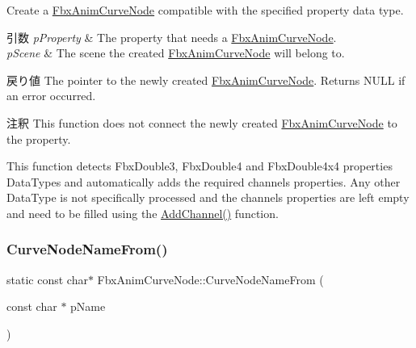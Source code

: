 Create a \hyperlink{class_fbx_anim_curve_node}{Fbx\+Anim\+Curve\+Node} compatible with the specified property data type. 
\begin{DoxyParams}{引数}
{\em p\+Property} & The property that needs a \hyperlink{class_fbx_anim_curve_node}{Fbx\+Anim\+Curve\+Node}. \\
\hline
{\em p\+Scene} & The scene the created \hyperlink{class_fbx_anim_curve_node}{Fbx\+Anim\+Curve\+Node} will belong to. \\
\hline
\end{DoxyParams}
\begin{DoxyReturn}{戻り値}
The pointer to the newly created \hyperlink{class_fbx_anim_curve_node}{Fbx\+Anim\+Curve\+Node}. Returns N\+U\+LL if an error occurred. 
\end{DoxyReturn}
\begin{DoxyRemark}{注釈}
This function does not connect the newly created \hyperlink{class_fbx_anim_curve_node}{Fbx\+Anim\+Curve\+Node} to the property. 

This function detects Fbx\+Double3, Fbx\+Double4 and Fbx\+Double4x4 properties Data\+Types and automatically adds the required channels properties. Any other Data\+Type is not specifically processed and the channels properties are left empty and need to be filled using the \hyperlink{class_fbx_anim_curve_node_a985772edb8c85825adfef69c6bd06627}{Add\+Channel()} function. 
\end{DoxyRemark}
\mbox{\label{class_fbx_anim_curve_node_ae75e53bb5e39cdefcd59e15e23924a13}} 
\subsubsection{\texorpdfstring{Curve\+Node\+Name\+From()}{CurveNodeNameFrom()}}
{\footnotesize\ttfamily static const char$\ast$ Fbx\+Anim\+Curve\+Node\+::\+Curve\+Node\+Name\+From (\begin{DoxyParamCaption}\item[{const char $\ast$}]{p\+Name }\end{DoxyParamCaption})\hspace{0.3cm}{\ttfamily [static]}}

\mbox{\label{class_fbx_anim_curve_node_aa5702533aa63185ec4549b73915476d7}} 
